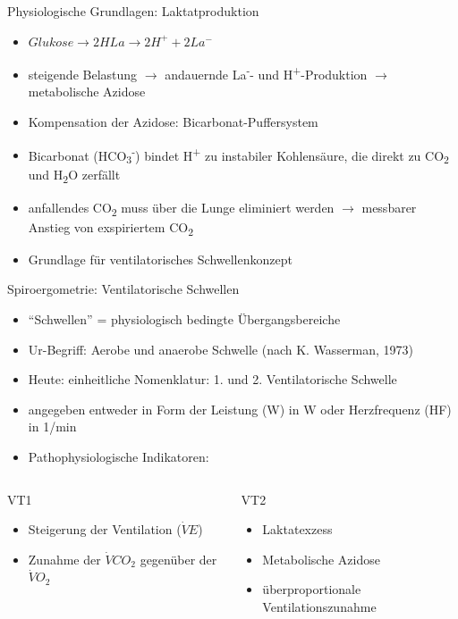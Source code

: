 \documentclass[colorBG,slideColor,9pt]{beamer}
\begin{document}
\begin{frame}{Physiologische Grundlagen: Laktatproduktion}
\begin{itemize}
\item $Glukose \rightarrow 2HLa \rightarrow 2H^+ + 2La^-$
\item steigende Belastung $\rightarrow$ andauernde La\textsuperscript{-}- und H\textsuperscript{+}-Produktion $\rightarrow$ metabolische Azidose
\item Kompensation der Azidose: Bicarbonat-Puffersystem
\item Bicarbonat (HCO\textsubscript{3}\textsuperscript{-}) bindet H\textsuperscript{+} zu instabiler Kohlensäure, die direkt zu CO\textsubscript{2} und H\textsubscript{2}O zerfällt
\item anfallendes CO\textsubscript{2} muss über die Lunge eliminiert werden $\rightarrow$ messbarer Anstieg von exspiriertem CO\textsubscript{2}
\item Grundlage für ventilatorisches Schwellenkonzept
\end{itemize}
\end{frame}

\begin{frame}{Spiroergometrie: Ventilatorische Schwellen}
\begin{itemize}
\item "`Schwellen"' = physiologisch bedingte Übergangsbereiche
\item Ur-Begriff: Aerobe und anaerobe Schwelle (nach K. Wasserman, 1973)
\item Heute: einheitliche Nomenklatur: 1. und 2. Ventilatorische Schwelle
\item angegeben entweder in Form der Leistung (W) in W oder Herzfrequenz (HF) in 1/min
\item Pathophysiologische Indikatoren:
\end{itemize}
\begin{columns}
\begin{column}{5cm}
\begin{block}{VT1}
\begin{itemize}
\item Steigerung der Ventilation ($\dot{V}E$)
\item Zunahme der $\dot{V}CO_2$ gegenüber der $\dot{V}O_2$
\end{itemize}
\end{block}
\end{column}
\begin{column}{5cm}
\begin{block}{VT2}
\begin{itemize}
\item Laktatexzess
\item Metabolische Azidose
\item überproportionale Ventilationszunahme
\end{itemize}
\end{block}
\end{column}
\end{columns}
\end{frame}
\end{document}
